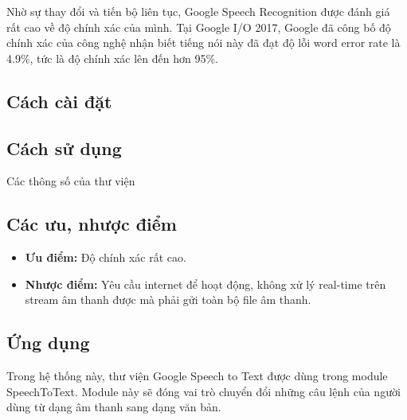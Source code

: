 Nhờ sự thay đổi và tiến bộ liên tục, Google Speech Recognition được đánh giá rất cao về độ chính xác của mình. Tại Google I/O 2017, Google đã công bố độ chính xác của công nghệ nhận biết tiếng nói này đã đạt độ lỗi word error rate là 4.9\%\cite{protalinski}, tức là độ chính xác lên đến hơn 95\%.

\subsection{Cách cài đặt}

\subsection{Cách sử dụng}

Các thông số của thư viện

\subsection{Các ưu, nhược điểm}

\begin{itemize}
    \item \textbf{Ưu điểm:} Độ chính xác rất cao.
    \item \textbf{Nhược điểm:} Yêu cầu internet để hoạt động, không xử lý real-time trên stream âm thanh được mà phải gửi toàn bộ file âm thanh.
\end{itemize}

\subsection{Ứng dụng}

Trong hệ thống này, thư viện Google Speech to Text được dùng trong module SpeechToText. Module này sẽ đóng vai trò chuyển đổi những câu lệnh của người dùng từ dạng âm thanh sang dạng văn bản.
